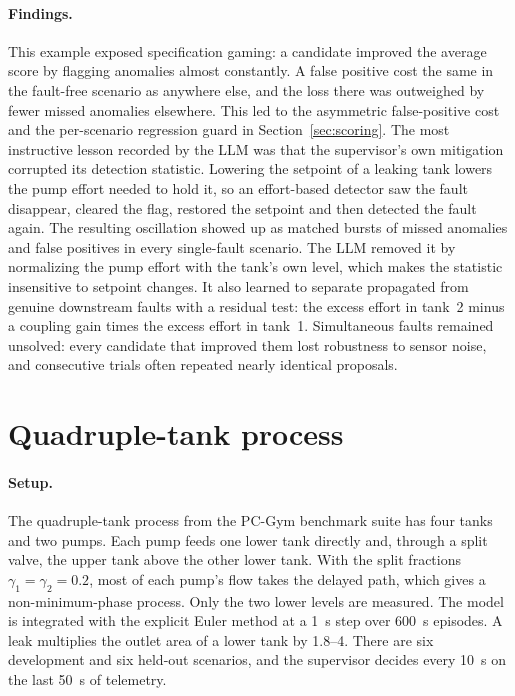 \paragraph{Findings.} This example exposed specification gaming: a candidate
improved the average score by flagging anomalies almost constantly. A false
positive cost the same in the fault-free scenario as anywhere else, and the
loss there was outweighed by fewer missed anomalies elsewhere. This led to the
asymmetric false-positive cost and the per-scenario regression guard in
Section~\ref{sec:scoring}. The most instructive lesson recorded by the LLM was
that the supervisor's own mitigation corrupted its detection statistic.
Lowering the setpoint of a leaking tank lowers the pump effort needed to hold
it, so an effort-based detector saw the fault disappear, cleared the flag,
restored the setpoint and then detected the fault again. The resulting
oscillation showed up as matched bursts of missed anomalies and false
positives in every single-fault scenario. The LLM removed it by normalizing
the pump effort with the tank's own level, which makes the statistic
insensitive to setpoint changes. It also learned to separate propagated from
genuine downstream faults with a residual test: the excess effort in tank~2
minus a coupling gain times the excess effort in tank~1. Simultaneous faults
remained unsolved: every candidate that improved them lost robustness to
sensor noise, and consecutive trials often repeated nearly identical
proposals.

\section{Quadruple-tank process}
\label{sec:four}
\paragraph{Setup.} The quadruple-tank process \cite{johansson2000} from the
PC-Gym benchmark suite \cite{bloor2024pcgym} has four tanks and two pumps.
Each pump feeds one lower tank directly and, through a split valve, the upper
tank above the other lower tank. With the split fractions
$\gamma_1 = \gamma_2 = 0.2$, most of each pump's flow takes the delayed path,
which gives a non-minimum-phase process. Only the two lower levels are
measured. The model is integrated with the explicit Euler method at a 1~s
step over 600~s episodes. A leak multiplies the outlet area of a lower tank
by 1.8--4. There are six development and six held-out scenarios, and the
supervisor decides every 10~s on the last 50~s of telemetry.


